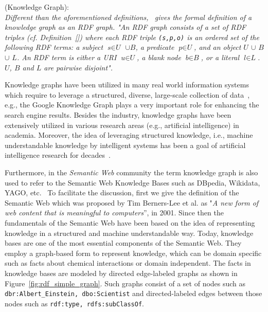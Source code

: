 \theoremstyle{definition}
\begin{definition}{(Knowledge Graph):\\}
\textit{Different than the aforementioned definitions,~\textcite{DBLP:journals/semweb/FarberBMR18} gives the formal definition of a knowledge graph as an RDF graph. "An RDF graph consists of a set of RDF triples (cf. Definition~\ref{}) where each RDF triple \texttt{(s,p,o)} is an ordered set of the following
RDF terms: a subject \texttt{$\textit{s}\in\textit{U}$} $\cup$\texttt{$\textit{B}$}, a predicate \texttt{$\textit{p}\in\textit{U}$}, and an object \texttt{$\textit{U}$} $\cup$  \texttt{$\textit{B}$} $\cup$ \texttt{$\textit{L}$}. An RDF term is either a URI \texttt{$\textit{u}\in\textit{U}$}, a blank node \texttt{$\textit{b}\in\textit{B}$}, or a literal \texttt{$\textit{l}\in\textit{L}$}. \texttt{$\textit{U}$},  \texttt{$\textit{B}$} and \texttt{$\textit{L}$} are pairwise disjoint".}~\cite{DBLP:journals/semweb/FarberBMR18}
\end{definition} 
\theoremstyle{definition}
Knowledge graphs have been utilized in many real world information systems which require to leverage a structured, diverse, large-scale collection of data~\cite{DBLP:journals/semweb/Paulheim17,hogan2020knowledge}, e.g., the Google Knowledge Graph plays a very important role for enhancing the search engine results.  Besides the industry, knowledge graphs have been extensively utilized in various research areas (e.g., artificial intelligence) in academia. Moreover, the idea of leveraging structured knowledge, i.e., machine understandable knowledge by intelligent systems has been a goal of artificial intelligence research for decades~\cite{DBLP:journals/semweb/Paulheim17}. %

Furthermore, in the \textit{Semantic Web} community the term knowledge graph is also used to refer to the Semantic Web Knowledge Bases such as DBpedia, Wikidata, YAGO, etc.~\cite{DBLP:journals/semweb/Paulheim17} To facilitate the discussion, first we give the definition of the Semantic Web which was proposed by Tim Berners-Lee et al. as "\textit{A new form of web content that is meaningful to computers}'', in 2001. Since then the fundamentals of the Semantic Web have been based on the idea of representing knowledge in a structured and machine understandable way. Today, knowledge bases are one of the most essential components of the Semantic Web.
They employ a graph-based form to represent knowledge, which can be domain specific such as facts about chemical interactions or domain independent. The facts in knowledge bases are modeled by directed edge-labeled graphs as shown in Figure~\ref{fig:rdf_simple_graph}. Such graphs consist of a set of nodes such as \texttt{dbr:Albert\_Einstein, dbo:Scientist} and directed-labeled edges between those nodes such as \texttt{rdf:type, rdfs:subClassOf}. 
\\\\


